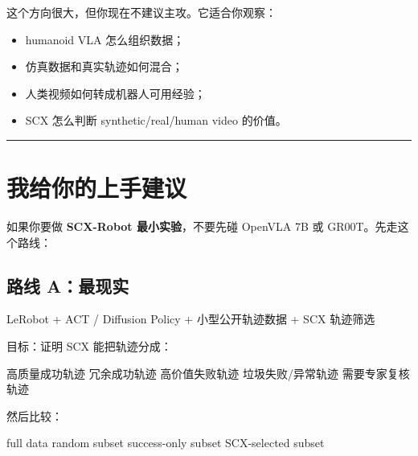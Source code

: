 \documentclass[
  12pt,
]{ctexart}
\newenvironment{Shaded}{}{}
\newcommand{\NormalTok}[1]{#1}
\providecommand{\tightlist}{%
  \setlength{\itemsep}{0pt}\setlength{\parskip}{0pt}}
\begin{document}
这个方向很大，但你现在不建议主攻。它适合你观察：

\begin{itemize}
\tightlist
\item
  humanoid VLA 怎么组织数据；
\item
  仿真数据和真实轨迹如何混合；
\item
  人类视频如何转成机器人可用经验；
\item
  SCX 怎么判断 synthetic/real/human video 的价值。
\end{itemize}

\begin{center}\rule{0.5\linewidth}{0.5pt}\end{center}

\section{我给你的上手建议}\label{ux6211ux7ed9ux4f60ux7684ux4e0aux624bux5efaux8bae}

如果你要做 \textbf{SCX-Robot 最小实验}，不要先碰 OpenVLA 7B 或
GR00T。先走这个路线：

\subsection{路线 A：最现实}\label{ux8defux7ebf-aux6700ux73b0ux5b9e}

\begin{Shaded}
\begin{Highlighting}[]
\NormalTok{LeRobot}
\NormalTok{+ ACT / Diffusion Policy}
\NormalTok{+ 小型公开轨迹数据}
\NormalTok{+ SCX 轨迹筛选}
\end{Highlighting}
\end{Shaded}

目标：证明 SCX 能把轨迹分成：

\begin{Shaded}
\begin{Highlighting}[]
\NormalTok{高质量成功轨迹}
\NormalTok{冗余成功轨迹}
\NormalTok{高价值失败轨迹}
\NormalTok{垃圾失败/异常轨迹}
\NormalTok{需要专家复核轨迹}
\end{Highlighting}
\end{Shaded}

然后比较：

\begin{Shaded}
\begin{Highlighting}[]
\NormalTok{full data}
\NormalTok{random subset}
\NormalTok{success{-}only subset}
\NormalTok{SCX{-}selected subset}
\end{Highlighting}
\end{Shaded}
\end{document}
